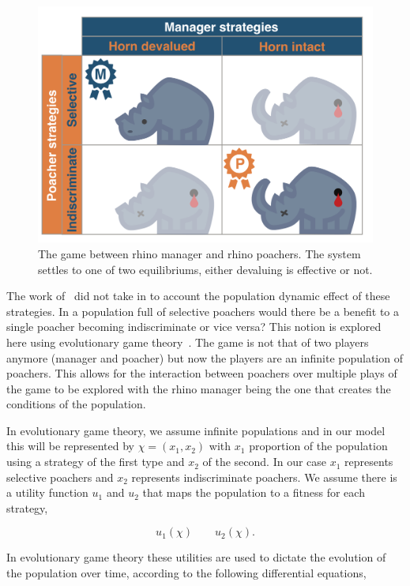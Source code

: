 \documentclass[10pt]{article}
\begin{document}
\begin{figure}[!htbp]
    \centering
    \includegraphics[scale=0.2]{images/RhinoPic.pdf}
    \caption{\label{fig:RhinoPic} The game between rhino manager and rhino 
    poachers. The system settles to one of two equilibriums, either devaluing is effective or not.}
\end{figure}

The work of~\cite{Lee} did not take in to account the population dynamic effect
of  these strategies. In a population full of selective poachers would there be 
a benefit to a single poacher becoming indiscriminate or vice versa? This notion 
is explored here using evolutionary game theory~\cite{Smith}. The 
game is not that of two players anymore (manager and poacher) but now the players are an infinite
population of poachers. This allows for the interaction between poachers
over multiple plays of the game to be explored with the rhino manager being the
one that creates the conditions of the population. 

In evolutionary game theory, we assume infinite populations and in our
model this will be represented by \(\chi=(x_1, x_2)\) with \(x_1\) proportion of the
population using a strategy of the first type and \(x_2\) of the second. In our case $x_1$ represents selective poachers and $x_2$ represents indiscriminate poachers. We assume there is a utility function \(u_1\) and 
\(u_2\) that maps the population to a fitness for each strategy,

\[ u_1(\chi)  \qquad u_2(\chi).\] 

In evolutionary game theory these utilities are used to dictate the evolution of
the population over time, according to the following differential equations,
\end{document}

